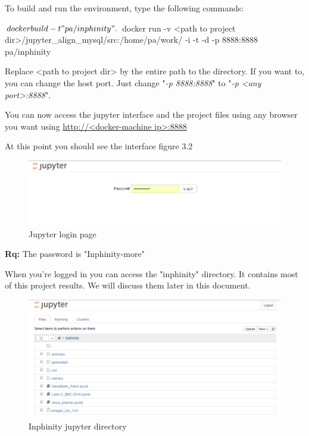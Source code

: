 \documentclass[a4paper,11pt]{report}
\begin{document}
To build and run the environment, type the following commands:
\begin{javacode}
$ docker build -t "pa/inphinity" .
$ docker run -v <path to project dir>/jupyter_align_mysql/src:/home/pa/work/ -i -t -d -p 8888:8888 pa/inphinity
\end{javacode}

Replace <path to project dir> by the entire path to the directory. If you want to, you can change the host port. Just change "\textit{-p 8888:8888}" to "\textit{-p <any port>:8888}".

You can now access the jupyter interface and the project files using any browser you want using \url{http://<docker-machine ip>:8888}

At this point you should see the interface figure 3.2

\begin{figure}[H] 
	\begin{center}
		\includegraphics[scale=0.45]{img/login_jupyter}
		\caption{Jupyter login page}
	\end{center}
\end{figure}

\textbf{Rq:} The password is "Inphinity-more"

When you're logged in you can access the "inphinity" directory. It contains most of this project results. We will discuss them later in this document.

\begin{figure}[H] 
	\begin{center}
		\includegraphics[scale=0.45]{img/inphinity_jupyter}
		\caption{Inphinity jupyter directory}
	\end{center}
\end{figure}
\newpage
\end{document}
